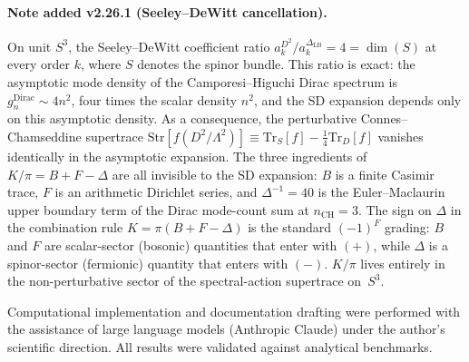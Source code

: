 \documentclass[aps,pra,twocolumn,superscriptaddress,longbibliography]{revtex4-2}
\begin{document}
\paragraph{Note added v2.26.1 (Seeley--DeWitt cancellation).}
On unit $S^{3}$, the Seeley--DeWitt coefficient ratio
$a_{k}^{D^{2}} / a_{k}^{\Delta_{\mathrm{LB}}} = 4 = \dim(S)$
at every order $k$, where $S$ denotes the spinor bundle.  This ratio
is exact: the asymptotic mode density of the Camporesi--Higuchi Dirac
spectrum is $g_{n}^{\mathrm{Dirac}} \sim 4n^{2}$, four times the
scalar density $n^{2}$, and the SD expansion depends only on this
asymptotic density.  As a consequence, the perturbative
Connes--Chamseddine supertrace
$\mathrm{Str}[f(D^{2}/\Lambda^{2})] \equiv
 \mathrm{Tr}_{S}[f] - \tfrac{1}{4}\mathrm{Tr}_{D}[f]$
vanishes identically in the asymptotic expansion.  The three
ingredients of $K/\pi = B + F - \Delta$ are all invisible to the
SD expansion: $B$ is a finite Casimir trace, $F$ is an arithmetic
Dirichlet series, and $\Delta^{-1} = 40$ is the Euler--Maclaurin
upper boundary term of the Dirac mode-count sum at $n_{\mathrm{CH}}
= 3$.  The sign on $\Delta$ in the combination rule $K = \pi(B + F -
\Delta)$ is the standard $(-1)^{F}$ grading: $B$ and $F$ are
scalar-sector (bosonic) quantities that enter with $(+)$, while
$\Delta$ is a spinor-sector (fermionic) quantity that enters with
$(-)$.  $K/\pi$ lives entirely in the non-perturbative sector of the
spectral-action supertrace on~$S^{3}$.

\begin{acknowledgments}
Computational implementation and documentation drafting were
performed with the assistance of large language models (Anthropic
Claude) under the author's scientific direction.  All results
were validated against analytical benchmarks.
\end{acknowledgments}


\end{document}
